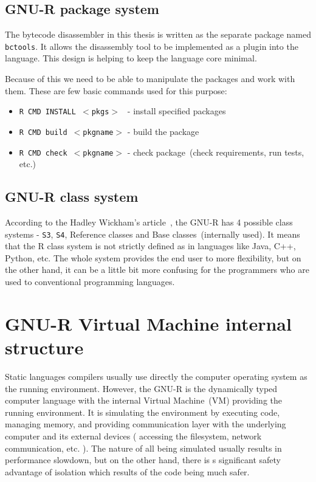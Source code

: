 \documentclass[thesis=M,english]{FITthesis}[2018/10/20]
\newcommand{\code}[1]{\texttt{#1}}
\begin{document}
\subsection{GNU-R package system}\label{R-Packages}

The bytecode disassembler in this thesis is written as the separate package named \code{bctools}. It allows the disassembly tool to be implemented as a plugin into the language. This design is helping to keep the language core minimal. 

Because of this we need to be able to manipulate the packages and work with them. These are few basic commands used for this purpose:

\begin{itemize}
	\item \code{R CMD INSTALL $<$pkgs$>$ } - install specified packages
	\item \code{R CMD build $<$pkgname$>$} - build the package
	\item \code{R CMD check $<$pkgname$>$} - check package~(check requirements, run tests, etc.)
\end{itemize}



\subsection{GNU-R class system}\label{R-Classes}

According to the Hadley Wickham's article~\cite{R-OO}, the GNU-R has 4 possible class systems - \code{S3}, \code{S4}, Reference classes and Base classes~(internally used). It means that the R class system is not strictly defined as in languages like Java, C++, Python, etc. The whole system provides the end user to more flexibility, but on the other hand, it can be a little bit more confusing for the programmers who are used to conventional programming languages.

\section{GNU-R Virtual Machine internal structure}\label{R-internal-structure}

Static languages compilers usually use directly the computer operating system as the running environment. However, the GNU-R is the dynamically typed computer language with the internal Virtual Machine~(VM) providing the running environment.
It is simulating the environment by executing code, managing memory, and providing communication layer with the underlying computer and its external devices ( accessing the filesystem, network communication, etc. ). The nature of all being simulated usually results in performance slowdown, but on the other hand, there is s significant safety advantage of isolation which results of the code being much safer.
\end{document}
